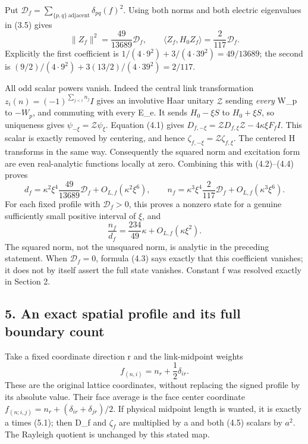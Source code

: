 \documentclass[
  11pt,
]{article}
\begin{document}
Put \(\mathcal D_f=\sum_{\{p,q\}\ \text{adjacent}}\delta_{pq}(f)^2\).
Using both norms and both electric eigenvalues in (3.5) gives \[
 \boxed{\|Z_f\|^2=\frac{49}{13689}\mathcal D_f,\qquad
 \langle Z_f,H_0Z_f\rangle=\frac{2}{117}\mathcal D_f.}
\tag{4.4}
\] Explicitly the first coefficient is
\(1/(4\cdot9^2)+3/(4\cdot39^2)=49/13689\); the second is
\((9/2)/(4\cdot9^2)+3(13/2)/(4\cdot39^2)=2/117\).

All odd scalar powers vanish. Indeed the central link transformation
\(z_i(n)=(-1)^{\sum_{j<i}n_j}I\) gives an involutive Haar unitary
\(\mathcal Z\) sending \emph{every} W\_p to \(-W_p\), and commuting with
every E\_e. It sends \(H_0-\xi S\) to \(H_0+\xi S\), so uniqueness gives
\(\psi_{-\xi}=\mathcal Z\psi_\xi\). Equation (4.1) gives
\(D_{f,-\xi}=\mathcal ZD_{f,\xi}\mathcal Z-4\kappa\xi F_fI\). This
scalar is exactly removed by centering, and hence
\(\zeta_{f,-\xi}=\mathcal Z\zeta_{f,\xi}\). The centered H transforms in
the same way. Consequently the squared norm and excitation form are even
real-analytic functions locally at zero. Combining this with
(4.2)--(4.4) proves \[
 d_f=\kappa^2\xi^4\frac{49}{13689}\mathcal D_f
                         +O_{L,f}(\kappa^2\xi^6),\qquad
 n_f=\kappa^3\xi^4\frac{2}{117}\mathcal D_f
                         +O_{L,f}(\kappa^3\xi^6).
\tag{4.5}
\] For each fixed profile with \(\mathcal D_f>0\), this proves a nonzero
state for a genuine sufficiently small positive interval of \(\xi\), and
\[
 \frac{n_f}{d_f}=\frac{234}{49}\kappa+O_{L,f}(\kappa\xi^2).
\tag{4.6}
\] The squared norm, not the unsquared norm, is analytic in the
preceding statement. When \(\mathcal D_f=0\), formula (4.3) says exactly
that this coefficient vanishes; it does not by itself assert the full
state vanishes. Constant f was resolved exactly in Section 2.

\subsection{5. An exact spatial profile and its full boundary
count}\label{magnetic-part-3-an-exact-spatial-profile-and-its-full-boundary-count}

Take a fixed coordinate direction r and the link-midpoint weights \[
 f_{(n,i)}=n_r+\frac12\delta_{ir}.
\tag{5.1}
\] These are the original lattice coordinates, without replacing the
signed profile by its absolute value. Their face average is the face
center coordinate \(f_{(n;i,j)}=n_r+(\delta_{ir}+\delta_{jr})/2\). If
physical midpoint length is wanted, it is exactly a times (5.1); then
D\_f and \(\zeta_f\) are multiplied by a and both (4.5) scalars by
\(a^2\). The Rayleigh quotient is unchanged by this stated map.
\end{document}
